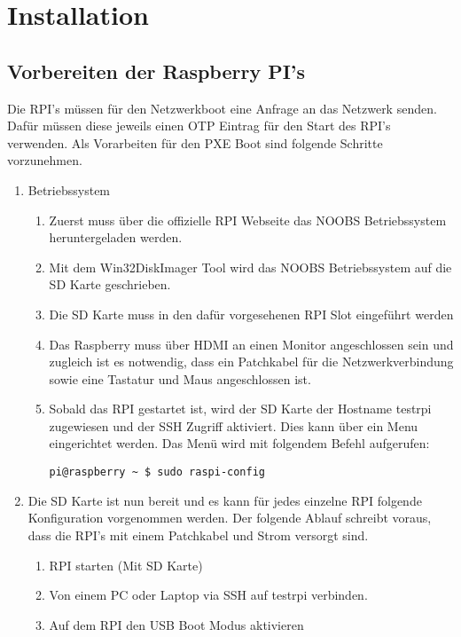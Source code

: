 \section{Installation}
\subsection{Vorbereiten der Raspberry PI's}
Die RPI's müssen für den Netzwerkboot eine Anfrage an das Netzwerk senden. Dafür müssen diese jeweils einen OTP Eintrag für den Start des RPI's verwenden. Als Vorarbeiten für den PXE Boot sind folgende Schritte vorzunehmen.

\begin{enumerate}
      \item Betriebssystem
      \begin{enumerate}
         \item Zuerst muss über die offizielle RPI Webseite das NOOBS Betriebssystem heruntergeladen werden.
         \item Mit dem Win32DiskImager Tool wird das NOOBS Betriebssystem auf die SD Karte geschrieben.
         \item Die SD Karte muss in den dafür vorgesehenen RPI Slot eingeführt werden
         \item Das Raspberry muss über HDMI an einen Monitor angeschlossen sein und zugleich ist es notwendig, dass ein Patchkabel für die Netzwerkverbindung sowie eine Tastatur und Maus angeschlossen ist.
         \item Sobald das RPI gestartet ist, wird der SD Karte der Hostname testrpi zugewiesen und der SSH Zugriff aktiviert. Dies kann über ein Menu eingerichtet werden. Das Menü wird mit folgendem Befehl aufgerufen:
         \begin{verbatim}
pi@raspberry ~ $ sudo raspi-config
\end{verbatim}
       \end{enumerate}
      \item Die SD Karte ist nun bereit und es kann für jedes einzelne RPI folgende Konfiguration vorgenommen werden. Der folgende Ablauf schreibt voraus, dass die RPI's mit einem Patchkabel und Strom versorgt sind.
      \begin{enumerate}
      \item RPI starten (Mit SD Karte)
      \item Von einem PC oder Laptop via SSH auf testrpi verbinden.
      \item Auf dem RPI den USB Boot Modus aktivieren

\end{enumerate}
\end{enumerate}
